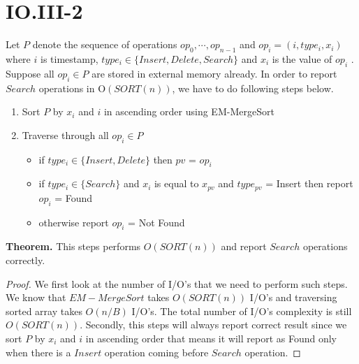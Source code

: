 \section*{IO.III-2}

Let $P$ denote the sequence of operations $op_0, \cdots, op_{n-1}$ and $op_i = (i,type_i,x_i)$ where $i$ is timestamp,
$type_i \in \{ Insert, Delete, Search \}$ and $x_i$ is the value of $op_i$ . Suppose all $op_i \in P$ are stored in external memory already.
In order to report $Search$ operations in O$(SORT(n))$, we have to do following steps below.
\begin{enumerate}
    \item Sort $P$ by $x_i$ and $i$ in ascending order using EM-MergeSort
    \item Traverse through all $op_i \in P$
        \begin{itemize}
            \item if $type_i \in \{ Insert, Delete \}$ then $pv$ = $op_i$
            \item if $type_i \in \{ Search \}$ and $x_i$ is equal to $x_{pv}$ and $type_{pv}$ = Insert
                then report $op_i$ = Found
            \item otherwise report $op_i$ = Not Found
        \end{itemize}
\end{enumerate}

\textbf{Theorem.} This steps performs $O( SORT(n) )$ and report $Search$ operations correctly.
\begin{proof}
We first look at the number of I/O's that we need to perform such steps.
We know that $EM-MergeSort$ takes $O(SORT(n))$ I/O's and traversing sorted array takes $O(n/B)$ I/O's.
The total number of I/O's complexity is still $O(SORT(n))$. Secondly, this steps will always report correct result since
we sort $P$ by $x_i$ and $i$ in ascending order that means it will report as Found only when there is a $Insert$ operation
coming before $Search$ operation.
\end{proof}

